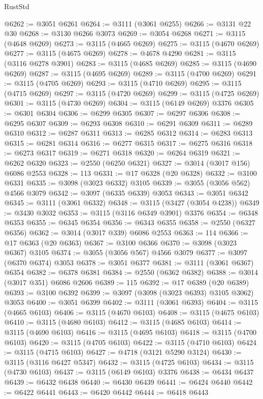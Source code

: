 \begin{lexlean}{RustStd}
\begin{coremodule}
{\begin{coremodule}
{{{{{{{{{{{{{{{{{{{{{{{{{{{{{{{{@6262 := @3051 @6261
@6264 := @3111 (@3061 @6255)
@6266 := @3131 @22 @30
@6268 := @3130 @6266 @3073
@6269 := @3054 @6268
@6271 := @3115 (@4648 @6269)
@6273 := @3115 (@4665 @6269)
@6275 := @3115 (@4670 @6269)
@6277 := @3115 (@4675 @6269)
@6278 := @4678 @4290
@6281 := @3115 (@3116 @6278 @3901)
@6283 := @3115 (@4685 @6269)
@6285 := @3115 (@4690 @6269)
@6287 := @3115 (@4695 @6269)
@6289 := @3115 (@4700 @6269)
@6291 := @3115 (@4705 @6269)
@6293 := @3115 (@4710 @6269)
@6295 := @3115 (@4715 @6269)
@6297 := @3115 (@4720 @6269)
@6299 := @3115 (@4725 @6269)
@6301 := @3115 (@4730 @6269)
@6304 := @3115 (@6149 @6269) @3376
@6305 := @6301 @6304
@6306 := @6299 @6305
@6307 := @6297 @6306
@6308 := @6295 @6307
@6309 := @6293 @6308
@6310 := @6291 @6309
@6311 := @6289 @6310
@6312 := @6287 @6311
@6313 := @6285 @6312
@6314 := @6283 @6313
@6315 := @6281 @6314
@6316 := @6277 @6315
@6317 := @6275 @6316
@6318 := @6273 @6317
@6319 := @6271 @6318
@6320 := @6264 @6319
@6321 := @6262 @6320
@6323 := @2550 (@6250 @6321)
@6327 := @3014 (@3017 @156) @6086 @2553
@6328 := 113
@6331 := @17 @6328 (@20 @6328)
@6332 := @3100 @6331
@6335 := @3098 (@3023 @6332) @3105
@6339 := @3055 (@3056 @562) @4566 @3079
@6342 := @3097 (@6335 @6339) @3053
@6343 := @3051 @6342
@6345 := @3111 (@3061 @6332)
@6348 := @3115 (@3427 (@3054 @4238))
@6349 := @3430 @3032
@6353 := @3115 (@3116 @6349 @3901) @3376
@6354 := @6348 @6353
@6355 := @6345 @6354
@6356 := @6343 @6355
@6358 := @2550 (@6327 @6356)
@6362 := @3014 (@3017 @339) @6086 @2553
@6363 := 114
@6366 := @17 @6363 (@20 @6363)
@6367 := @3100 @6366
@6370 := @3098 (@3023 @6367) @3105
@6374 := @3055 (@3056 @567) @4566 @3079
@6377 := @3097 (@6370 @6374) @3053
@6378 := @3051 @6377
@6381 := @3111 (@3061 @6367) @6354
@6382 := @6378 @6381
@6384 := @2550 (@6362 @6382)
@6388 := @3014 (@3017 @351) @6086 @2606
@6389 := 115
@6392 := @17 @6389 (@20 @6389)
@6393 := @3100 @6392
@6399 := @3097 (@3098 (@3023 @6393) @3105 @3062) @3053
@6400 := @3051 @6399
@6402 := @3111 (@3061 @6393)
@6404 := @3115 (@4665 @6103)
@6406 := @3115 (@4670 @6103)
@6408 := @3115 (@4675 @6103)
@6410 := @3115 (@4680 @6103)
@6412 := @3115 (@4685 @6103)
@6414 := @3115 (@4690 @6103)
@6416 := @3115 (@4695 @6103)
@6418 := @3115 (@4700 @6103)
@6420 := @3115 (@4705 @6103)
@6422 := @3115 (@4710 @6103)
@6424 := @3115 (@4715 @6103)
@6427 := @4718 (@3121 @5290 @3124)
@6430 := @3115 (@3116 @6427 @5347)
@6432 := @3115 (@4725 @6103)
@6434 := @3115 (@4730 @6103)
@6437 := @3115 (@6149 @6103) @3376
@6438 := @6434 @6437
@6439 := @6432 @6438
@6440 := @6430 @6439
@6441 := @6424 @6440
@6442 := @6422 @6441
@6443 := @6420 @6442
@6444 := @6418 @6443
}}}}}}}}}}}}}}}}}}}}}}}}}}}}}}}}
\end{coremodule}}
\end{coremodule}
\end{lexlean}
